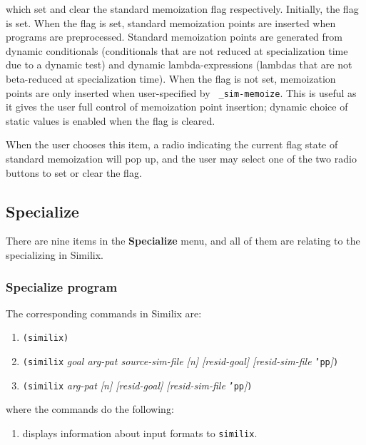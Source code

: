\begin{sloppypar}
\noindent which set and clear the standard memoization flag respectively.
Initially, the flag is set. When the flag is set, standard memoization
points are inserted when programs are preprocessed. Standard
memoization points are generated from dynamic conditionals
(conditionals that are not reduced at specialization time due to a
dynamic test) and dynamic lambda-expressions (lambdas that are not
beta-reduced at specialization time). When the flag is not set,
memoization points are only inserted when user-specified by {\tt
\_sim-memoize}. This is useful as it gives the user full control of
memoization point insertion; dynamic choice of static values is
enabled when the flag is cleared.

   When the user chooses this item, a radio indicating the current
flag state of standard memoization will pop up, and the user may
select one of the two radio buttons to set or clear the flag.



\subsection{Specialize}


There are nine items in the {\bf Specialize} menu, and all of them are
relating to the specializing in Similix.



\subsubsection{Specialize program}


The corresponding commands in Similix are:

\begin{enumerate}
\item {\tt (similix)}
\item {\tt (similix} {\it goal arg-pat source-sim-file [n] [resid-goal] [resid-sim-file} {\tt 'pp}{\it ]}{\tt )}
\item {\tt (similix} {\it arg-pat [n] [resid-goal] [resid-sim-file} {\tt 'pp}{\it]}{\tt)}
\end{enumerate}

\noindent where the commands do the following:

\begin{enumerate}

\item displays information about input formats to {\tt similix}.


\end{enumerate}
\end{sloppypar}

